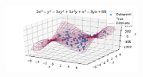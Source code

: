 \documentclass[12pt]{article}
\begin{document}
\begin{figure}[H]
            \includegraphics[width=0.45\textwidth]{f_8_noise3_estplot_regular}
        \end{figure}

    
    

    
\end{document}
